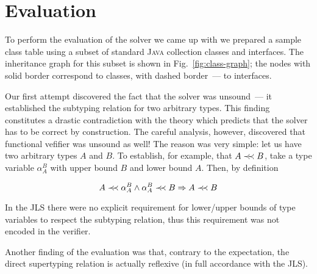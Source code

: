 \section{Evaluation}
\label{sec:eval}


\begin{comment}
    On pic.~\ref{fig:class-graph} class \textbf{AbstractCollection} extends class \textbf{Object}. Also classes \textbf{ArrayList}, \textbf{Vector}, \textbf{LinkedList}, \textbf{HashSet}, \textbf{TreeSet}, \textbf{ConcurrentSkipListSet} and \textbf{LinkedHashSet} implements interfaces \textbf{Cloneable} and \textbf{Serializable}. Classes \textbf{BlockingQueue} and \textbf{LinkedBlockingDeque} implements interface \textbf{Serializable} only.
\end{comment}

To perform the evaluation of the solver we came up with we prepared a sample class table using a subset of standard \textsc{Java} collection classes and interfaces. The
inheritance graph for this subset is shown in Fig.~\ref{fig:class-graph}; the nodes with solid border correspond to classes, with dashed border~--- to interfaces.

Our first attempt discovered the fact that the solver was unsound~--- it established the subtyping relation for two arbitrary types. This finding constitutes a drastic
contradiction with the theory which predicts that the solver has to be correct by construction. The careful analysis, however, discovered that functional
vefifier was unsound as well! The reason was very simple: let us have two arbitrary types $A$ and $B$. To establish, for example, that $A \prec\mathrel{\mkern-5mu}\prec B$, take a
type variable $\alpha^B_A$ with upper bound $B$ and lower bound $A$. Then, by definition

\[
A\prec\mathrel{\mkern-5mu}\prec \alpha^B_A \wedge \alpha^B_A\prec\mathrel{\mkern-5mu}\prec B \Rightarrow A\prec\mathrel{\mkern-5mu}\prec B
\]

In the JLS there were no explicit requirement for lower/upper bounds of type variables to respect the subtyping relation, thus this requirement was not
encoded in the verifier.

Another finding of the evaluation was that, contrary to the expectation, the direct supertyping relation is actually reflexive (in full accordance with the JLS).

